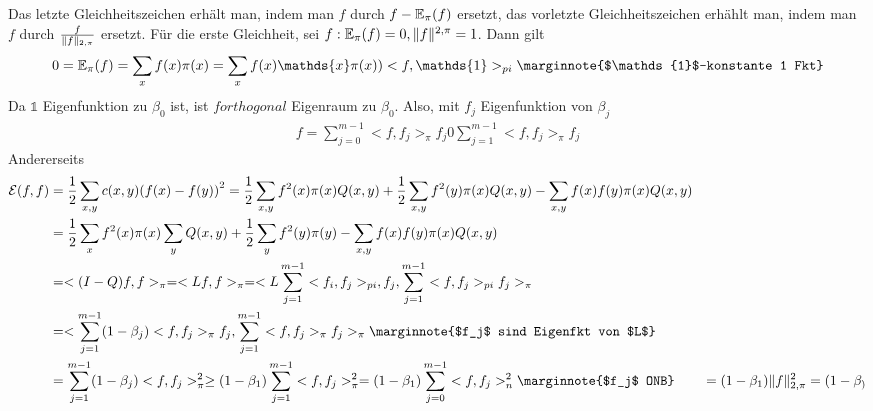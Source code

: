 \begin{beweis}
	Das letzte Gleichheitszeichen erhält man, indem man $f$ durch $f- \EW{\relax}_{\pi}(f)$ ersetzt, das vorletzte Gleichheitszeichen erhählt man, indem man $f$ durch $\frac{f}{\lVert f\rVert_{2,\pi}}$ ersetzt.
	Für die erste Gleichheit, sei $f: \EW{\relax}_{\pi}(f) = 0, \Norm{f}^{2,\pi} = 1$. Dann gilt
	\begin{align}
		0 = \EW{\relax}_{\pi}(f)= \sum\limits_{x}f(x)\pi(x) = \sum\limits_{x} f(x) \mathds{x} \pi(x) ) <f,\mathds{1}>_{pi} \marginnote{$\mathds{1}$-konstante 1 Fkt}
	\end{align}
	Da $\mathds{1}$ Eigenfunktion zu $\beta_0$ ist, ist $f orthogonal$ Eigenraum zu $\beta_0$. Also, mit $f_j$ Eigenfunktion von $\beta_j$
	\begin{align}
		f = \sum\limits_{j = 0}^{m-1}<f,f_j>_{\pi}f_j 0 \sum\limits_{j = 1}^{m-1}<f,f_j>_{\pi} f_j 
	\end{align}
	Andererseits
	\begin{align}
		\mathcal{E}(f,f) &= \frac{1}{2} \sum\limits_{x,y}c(x,y) \enb{f(x) - f(y)}^2 = \frac{1}{2} \sum\limits_{x,y}f^2(x) \pi(x) Q(x,y) + \frac{1}{2} \sum\limits_{x,y} f^2(y) \pi(x) Q(x,y) - \sum\limits_{x,y} f(x)f(y)\pi(x) Q(x,y) \\
		&= \frac{1}{2} \sum\limits_{x}f^2(x) \pi(x) \sum\limits_{y} Q (x,y) + \frac{1}{2} \sum\limits_{y} f^2(y) \pi(y) - \sum\limits_{x,y}f(x) f(y) \pi(x) Q(x,y) \\
		&= <(I-Q)f,f >_{\pi} = <Lf,f>_{\pi} = <L\sum\limits_{j=1}^{m-1}<f_i,f_j>_{pi},f_j, \sum\limits_{j=1}^{m-1}<f,f_j>_{pi}f_j>_{\pi} \\
		&= <\sum\limits_{j=1}^{m-1}(1-\beta_j)<f,f_j>_{\pi}f_j,\sum\limits_{j=1}^{m-1}<f,f_j>_{\pi}f_j>_{\pi} \marginnote{$f_j$ sind Eigenfkt von $L$} \\
		&= \sum\limits_{j = 1}^{m-1}(1-\beta_j)<f,f_j>^2_{\pi}\geq \enb{1-\beta_1} \sum\limits_{j = 1}^{m-1}<f,f_j>^2_{\pi}  =\enb{1-\beta_1} \sum\limits_{j = 0}^{m-1}<f,f_j>^2_n \marginnote{$f_j$ ONB}
		&= \enb{1- \beta_1} \Norm{f}^2_{2,\pi} = (1-\beta_)
	\end{align}
\end{beweis}

